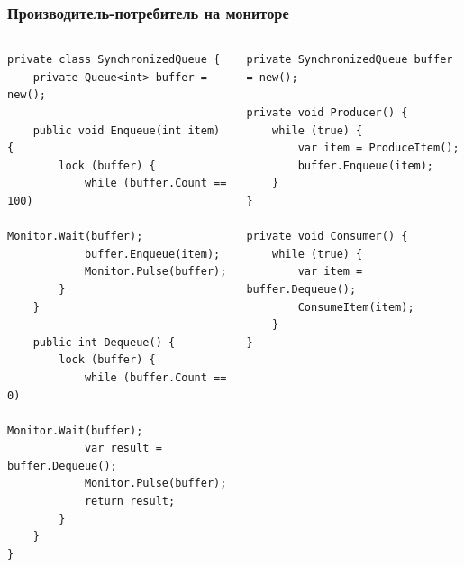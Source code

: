 \documentclass{../../slides-style}
\begin{document}
    \begin{frame}[fragile]
        \frametitle{Производитель-потребитель на мониторе}
        \begin{scriptsize}
            \begin{columns}
                \begin{column}{0.5\textwidth}
                    \begin{verbatim}
private class SynchronizedQueue {
    private Queue<int> buffer = new();

    public void Enqueue(int item) {
        lock (buffer) {
            while (buffer.Count == 100)
                Monitor.Wait(buffer);
            buffer.Enqueue(item);
            Monitor.Pulse(buffer);
        }
    }

    public int Dequeue() {
        lock (buffer) {
            while (buffer.Count == 0)
                Monitor.Wait(buffer);
            var result = buffer.Dequeue();
            Monitor.Pulse(buffer);
            return result;
        }
    }
}
                    \end{verbatim}
                \end{column}
                \begin{column}{0.5\textwidth}
                    \begin{verbatim}
private SynchronizedQueue buffer = new();

private void Producer() {
    while (true) {
        var item = ProduceItem();
        buffer.Enqueue(item);
    }
}

private void Consumer() {
    while (true) {
        var item = buffer.Dequeue();
        ConsumeItem(item);
    }
}
                    \end{verbatim}
                \end{column}
            \end{columns}
        \end{scriptsize}
    \end{frame}
\end{document}
